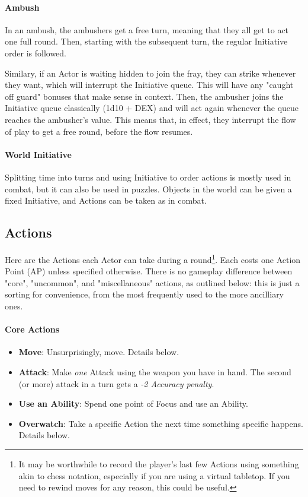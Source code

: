 \paragraph{Ambush}

In an ambush, the ambushers get a free turn, meaning that they all get to act one full round. Then, starting with the subsequent turn, the regular Initiative order is followed.

Similary, if an Actor is waiting hidden to join the fray, they can strike whenever they want, which will interrupt the Initiative queue. This will have any "caught off guard" bonuses that make sense in context. Then, the ambusher joins the Initiative queue classically (1d10 + DEX) and will act again whenever the queue reaches the ambusher's value. This means that, in effect, they interrupt the flow of play to get a free round, before the flow resumes.

\paragraph{World Initiative}

Splitting time into turns and using Initiative to order actions is mostly used in combat, but it can also be used in puzzles. Objects in the world can be given a fixed Initiative, and Actions can be taken as in combat. 


\subsection{Actions}
\label{actions}

Here are the Actions each Actor can take during a round\footnote{It may be worthwhile to record the player's last few Actions using something akin to chess notation, especially if you are using a virtual tabletop. If you need to rewind moves for any reason, this could be useful.}. Each costs one Action Point (AP) unless specified otherwise. There is no gameplay difference between "core", "uncommon", and "miscellaneous" actions, as outlined below: this is just a sorting for convenience, from the most frequently used to the more ancilliary ones.

\paragraph{Core Actions}
\begin{itemize}
    \item \textbf{Move}: Unsurprisingly, move. Details below.
    \item \textbf{Attack}: Make \textit{one} Attack using the weapon you have in hand. The second (or more) attack in a turn gets a \textit{-2 Accuracy penalty}.
    \item \textbf{Use an Ability}: Spend one point of Focus and use an Ability.
    \item \textbf{Overwatch}: Take a specific Action the next time something specific happens. Details below.
\end{itemize}

